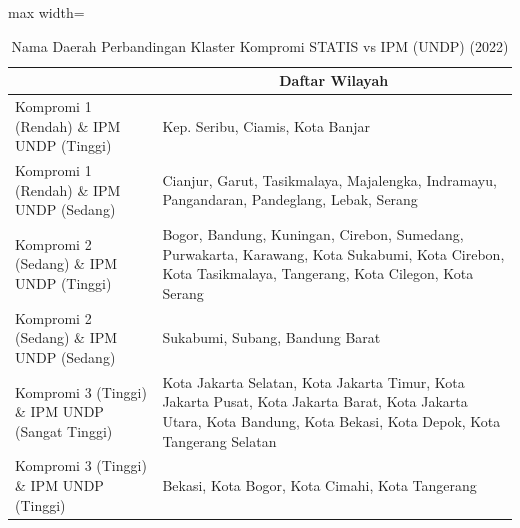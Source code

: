 \begin{table}[H]
\centering
\caption{Nama Daerah Perbandingan Klaster Kompromi STATIS vs IPM (UNDP) (2022)} \label{tab:app2comp_ipm_name_2022}
\begin{adjustbox}{max width=\textwidth}
\begin{tabular}{|>{\centering\arraybackslash}p{4cm}|p{10cm}|}
\hline
\multicolumn{1}{|c|}{\textbf{Kategori}} & \multicolumn{1}{c|}{\textbf{Daftar Wilayah}} \\
\hline
Kompromi 1 (Rendah) \& IPM UNDP (Tinggi) & Kep. Seribu, Ciamis, Kota Banjar \\
\hline
Kompromi 1 (Rendah) \& IPM UNDP (Sedang) & Cianjur, Garut, Tasikmalaya, Majalengka, Indramayu, Pangandaran, Pandeglang, Lebak, Serang \\
\hline
Kompromi 2 (Sedang) \& IPM UNDP (Tinggi) & Bogor, Bandung, Kuningan, Cirebon, Sumedang, Purwakarta, Karawang, Kota Sukabumi, Kota Cirebon, Kota Tasikmalaya, Tangerang, Kota Cilegon, Kota Serang \\
\hline
Kompromi 2 (Sedang) \& IPM UNDP (Sedang) & Sukabumi, Subang, Bandung Barat \\
\hline
Kompromi 3 (Tinggi) \& IPM UNDP (Sangat Tinggi) & Kota Jakarta Selatan, Kota Jakarta Timur, Kota Jakarta Pusat, Kota Jakarta Barat, Kota Jakarta Utara, Kota Bandung, Kota Bekasi, Kota Depok, Kota Tangerang Selatan \\
\hline
Kompromi 3 (Tinggi) \& IPM UNDP (Tinggi) & Bekasi, Kota Bogor, Kota Cimahi, Kota Tangerang \\
\hline
\end{tabular}
\end{adjustbox}
\end{table}